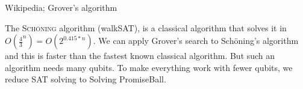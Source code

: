 \documentclass[portrait,a0paper,fontscale=0.285]{baposter} %
\begin{document}
\begin{poster}
{\begin{center}
\begin{tiny}Wikipedia; Grover's algorithm\end{tiny}
\end{center}
\vspace{-0.5em}

The \textcolor{ourred}{\textsc{Sch\"{o}ning}} algorithm (walkSAT), is a classical algorithm that solves it in $O(\frac{4}{3}^{n})=O(2^{0.415*n})$. We can apply Grover's search to Sch\"{o}ning's algorithm and this is faster than the fastest known classical algorithm. But such an algorithm needs many qubits. To make everything work with fewer qubits, we reduce SAT solving to Solving PromiseBall. 

}


\end{poster}
\end{document}
